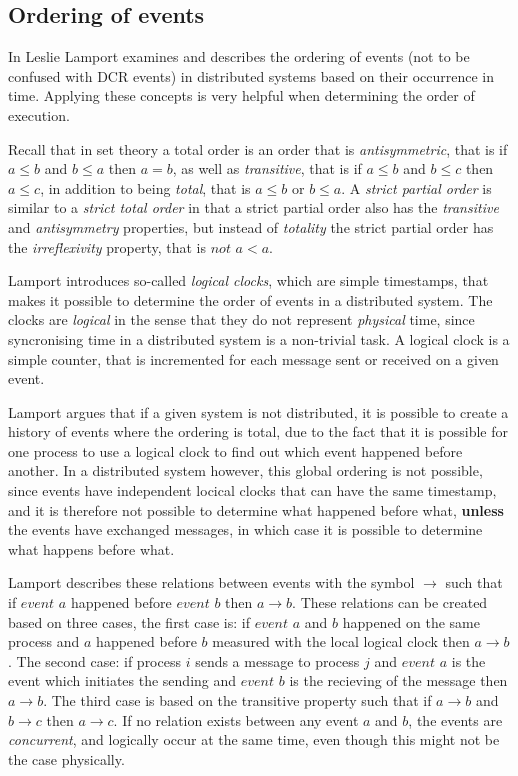 		\subsection{Ordering of events}\label{subsec:orderingofevents}
		In \cite{Lamport:1978:TCO:359545.359563} Leslie Lamport examines and describes the ordering of events (not to be confused with DCR events) in distributed systems based on their occurrence in time. Applying these concepts is very helpful when determining the order of execution. 
		

		\newpar {}Recall that in set theory a total order is an order that is \textit{antisymmetric}, that is if $a \leq b$ and $b \leq a$ then $a = b$, as well as \textit{transitive}, that is if $a \leq b$ and $b \leq c$ then $a \leq c$, in addition to being \textit{total}, that is $a \leq b$ or $b \leq a$. A \textit{strict partial order} is similar to a \textit{strict total order} in that a strict partial order also has the \textit{transitive} and \textit{antisymmetry} properties, but instead of \textit{totality} the strict partial order has the \textit{irreflexivity} property, that is $not$ $a < a$. 
		
		\newpar Lamport introduces so-called \textit{logical clocks}, which are simple timestamps, that makes it possible to determine the order of events in a distributed system. The clocks are \textit{logical} in the sense that they do not represent \textit{physical} time, since syncronising time in a distributed system is a non-trivial task. A logical clock is a simple counter, that is incremented for each message sent or received on a given event. 
		
		\newpar Lamport argues that if a given system is not distributed, it is possible to create a history of events where the ordering is total, due to the fact that it is possible for one process to use a logical clock to find out which event happened before another. In a distributed system however, this global ordering is not possible, since events have independent locical clocks that can have the same timestamp, and it is therefore not possible to determine what happened before what, \textbf{unless} the events have exchanged messages, in which case it is possible to determine what happens before what.
		
		\newpar Lamport describes these relations between events with the symbol $\rightarrow$ such that if $event$ $a$ happened before $event$ $b$ then $a \rightarrow b$. These relations can be created based on three cases, the first case is: if $event$ $a$ and $b$ happened on the same process and $a$ happened before $b$ measured with the local logical clock then $a \rightarrow b$. The second case: if process $i$ sends a message to process $j$ and $event$ $a$ is the event which initiates the sending and $event$ $b$ is the recieving of the message then $a \rightarrow b$. The third case is based on the transitive property such that if $a \rightarrow b$ and $b \rightarrow c$ then $a \rightarrow c$. If no relation exists between any event $a$ and $b$, the events are \textit{concurrent}, and logically  occur at the same time, even though this might not be the case physically. 
		
